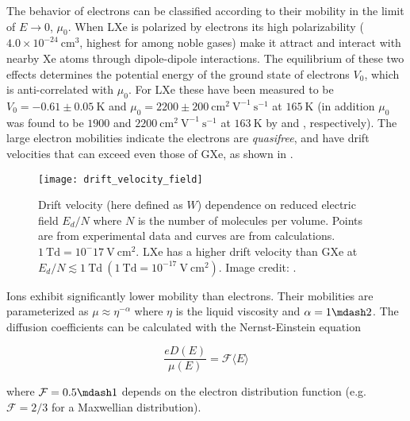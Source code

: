 The behavior of electrons can be classified according to their mobility in the limit of $E \rightarrow 0$, $\mu_0$.  When LXe is
polarized by electrons its high polarizability ($4.0 \times 10^{-24}\ \mathrm{cm^3}$, highest for among noble gases) make it
attract \electron and interact with nearby Xe atoms through dipole-dipole interactions.  The equilibrium of these two effects
determines the potential energy of the ground state of electrons $V_0$, which is anti-correlated with $\mu_0$.  For LXe these have
been measured to be $V_0 = -0.61 \pm 0.05\ \mathrm{K}$  and $\mu_0 = 2200 \pm 200\ \mathrm{cm^2\ V^{-1}\ s^{-1}}$
 at $165\ \mathrm{K}$ (in addition $\mu_0$ was found to be $1900$ and $2200\ \mathrm{cm^2\ V^{-1}\ s^{-1}}$
at $163\ \mathrm{K}$ by  and , respectively).  The large electron mobilities indicate the
electrons are \textit{quasifree}, and have drift velocities that can exceed even those of GXe, as shown in
.

\begin{figure}
\centering
\texttt{[image: drift\_velocity\_field]}
\caption{Drift velocity (here defined as $W$) dependence on reduced electric field $E_d/N$ where $N$ is the number of molecules per
volume.  Points are from experimental data  and curves are from
calculations.  $1\ \mathrm{Td} = 10^-17\ \mathrm{V\ cm^2}$.  LXe has a higher drift velocity than GXe at
$E_d/N \lesssim 1\ \mathrm{Td}\ (1\ \mathrm{Td} = 10^{-17}\ \mathrm{V\ cm^2})$.  Image credit: .}
\label{fig:importance_procedure_effects_charge_drift_velocity}
\end{figure}

Ions exhibit significantly lower mobility than electrons.  Their mobilities are parameterized as $\mu \approx \eta^{-\alpha}$ where
$\eta$ is the liquid viscosity and $\alpha = 1 \mdash 2$.  The diffusion coefficients can be calculated with the Nernst-Einstein equation

\vspace{-10pt}

\begin{equation}
\frac{e D(E)}{\mu (E)} = \mathcal{F} \langle E \rangle
\end{equation}

\noindent where $\mathcal{F} = 0.5 \mdash 1$ depends on the electron distribution function (e.g. $\mathcal{F} = 2/3$ for a
Maxwellian distribution).

